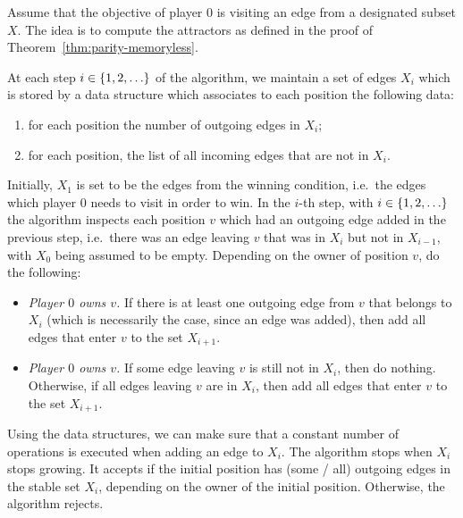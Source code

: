 
{

}

{
Assume that the objective of player $0$ is visiting an edge from a designated subset $X$.  The idea is to compute  the attractors as defined in  the proof of Theorem~\ref{thm:parity-memoryless}.

At each step $i \in \{1,2,\ldots\}$ of the algorithm, we maintain a set of edges $X_i$ which is stored by a data structure which associates to each position  the following data:
\begin{enumerate}
	\item for each position the number of outgoing edges in $X_i$;
	\item for each position, the list of all  incoming edges that are not  in $X_i$.
\end{enumerate}
  Initially, $X_1$ is set to be the edges from the winning condition, i.e.~the edges which player $0$ needs to visit in order to win.  In the $i$-th step, with $i \in \{1,2,\ldots\}$ the algorithm inspects each position $v$ which had an outgoing edge added in the previous step, i.e.~there 
was an edge leaving $v$ that was in $X_i$ but not in $X_{i-1}$, with $X_0$ being assumed to be empty.   Depending on the owner of position $v$, do the following:
\begin{itemize}
	\item \emph{Player $0$ owns $v$.} If there is  at least one outgoing edge from $v$ that belongs to $X_i$ (which is necessarily the case, since an edge was added), then add all edges that enter $v$ to the set $X_{i+1}$.
	 	\item \emph{Player $0$ owns $v$.} If some  edge leaving $v$ is still not in  $X_i$, then do nothing. Otherwise, if all edges leaving $v$ are in $X_i$, then add all edges that enter $v$ to the set $X_{i+1}$.
\end{itemize}
Using the data structures, we can make sure that a constant number of operations is executed when adding an edge to $X_i$. The algorithm stops when $X_i$ stops growing. It accepts if the initial position has (some / all) outgoing edges in the stable set $X_i$, depending on the owner of the initial position. Otherwise, the algorithm rejects.
}



